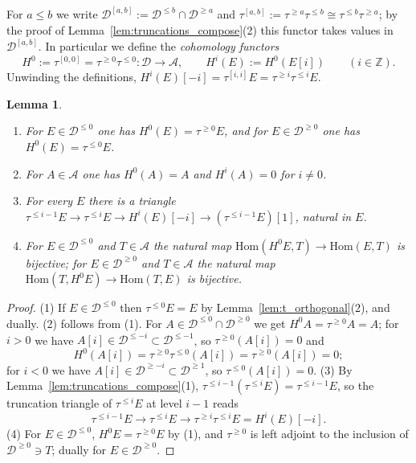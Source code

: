 \documentclass[12pt]{amsart}
\newtheorem{lemma}[theorem]{Lemma}
\numberwithin{theorem}{section}
\theoremstyle{definition}
\newcommand{\ZZ}{\mathbb{Z}}
\newcommand{\calA}{\mathcal{A}}
\newcommand{\Hom}{\mathrm{Hom}}
\newcommand{\calD}{\mathcal{D}}
\newcommand{\Dle}[1]{\calD^{\leqslant #1}}
\newcommand{\Dge}[1]{\calD^{\geqslant #1}}
\newcommand{\Dint}[2]{\calD^{[#1, #2]}}
\begin{document}
	For $a \leqslant b$ we write $\Dint{a}{b} := \Dle{b} \cap \Dge{a}$ and $\tau^{[a, b]} := \tau^{\geqslant a} \tau^{\leqslant b} \cong \tau^{\leqslant b} \tau^{\geqslant a}$; by the proof of Lemma~\ref{lem:truncations_compose}(2) this functor takes values in $\Dint{a}{b}$.
	In particular we define the \emph{cohomology functors}
	\[
	H^0 := \tau^{[0, 0]} = \tau^{\geqslant 0} \tau^{\leqslant 0} \colon \calD \longrightarrow \calA ,
	\qquad
	H^i(E) := H^0(E[i]) \qquad (i \in \ZZ) .
	\]
	Unwinding the definitions, $H^i(E)[-i] = \tau^{[i, i]} E = \tau^{\geqslant i} \tau^{\leqslant i} E$.
	
	\begin{lemma}
		\label{lem:H0_basic}
		\begin{enumerate}
			\item For $E \in \Dle{0}$ one has $H^0(E) = \tau^{\geqslant 0} E$, and for $E \in \Dge{0}$ one has $H^0(E) = \tau^{\leqslant 0} E$.
			\item For $A \in \calA$ one has $H^0(A) = A$ and $H^i(A) = 0$ for $i \neq 0$.
			\item For every $E$ there is a triangle $\tau^{\leqslant i-1} E \to \tau^{\leqslant i} E \to H^i(E)[-i] \to (\tau^{\leqslant i-1} E)[1]$, natural in $E$.
			\item For $E \in \Dle{0}$ and $T \in \calA$ the natural map $\Hom(H^0 E, T) \to \Hom(E, T)$ is bijective; for $E \in \Dge{0}$ and $T \in \calA$ the natural map $\Hom(T, H^0 E) \to \Hom(T, E)$ is bijective.
		\end{enumerate}
	\end{lemma}
	
	\begin{proof}
		(1) If $E \in \Dle{0}$ then $\tau^{\leqslant 0} E = E$ by Lemma~\ref{lem:t_orthogonal}(2), and dually.
		(2) follows from (1).
		For $A \in \Dle{0} \cap \Dge{0}$ we get $H^0 A = \tau^{\geqslant 0} A = A$;
		for $i > 0$ we have $A[i] \in \Dle{-i} \subset \Dle{-1}$, so $\tau^{\geqslant 0}(A[i]) = 0$ 
		and 
		\[
		H^0(A[i]) = \tau^{\geqslant 0} \tau^{\leqslant 0} (A[i]) = \tau^{\geqslant 0}(A[i]) = 0;
		\]
		for $i < 0$ we have $A[i] \in \Dge{-i} \subset \Dge{1}$, so $\tau^{\leqslant 0}(A[i]) = 0$.
		(3) By Lemma~\ref{lem:truncations_compose}(1), 
		$\tau^{\leqslant i-1}(\tau^{\leqslant i} E) = \tau^{\leqslant i-1} E$, 
		so the truncation triangle of $\tau^{\leqslant i} E$ at level $i-1$ reads 
		\[
		\tau^{\leqslant i-1} E \to \tau^{\leqslant i} E \to \tau^{\geqslant i} \tau^{\leqslant i} E = H^i(E)[-i].
		\]
		(4) For $E \in \Dle{0}$, $H^0 E = \tau^{\geqslant 0} E$ by (1), and $\tau^{\geqslant 0}$ is left adjoint to the inclusion of $\Dge{0} \ni T$; dually for $E \in \Dge{0}$.
	\end{proof}
	
\end{document}
